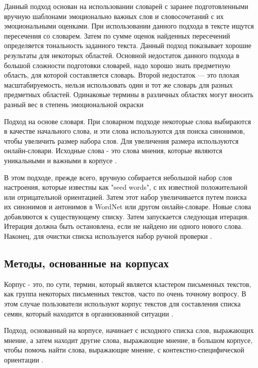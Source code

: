 Данный подход основан на использовании словарей с заранее подготовленными
вручную шаблонами эмоционально важных слов и словосочетаний с их эмоциональными
оценками. При использовании данного подхода в тексте ищутся пересечения со
словарем. Затем по сумме оценок найденных пересечений определяется тональность
заданного текста. Данный подход показывает хорошие результаты для некоторых
областей. Основной недостаток данного подхода в большой сложности подготовки
словарей, надо хорошо знать предметную область, для которой составляется
словарь. Второй недостаток — это плохая масштабируемость, нельзя использовать
один и тот же словарь для разных предметных областей. Одинаковые термины в
различных областях могут вносить разный вес в степень эмоциональной окраски
\cite{article9}

Подход на основе словаря. При словарном подходе некоторые слова выбираются в
качестве начального слова, и эти слова используются для поиска синонимов, чтобы
увеличить размер набора слов. Для увеличения размера используются
онлайн-словари. Исходные слова - это слова мнения, которые являются уникальными
и важными в корпусе \cite{article16}.

В этом подходе, прежде всего, вручную собирается небольшой набор слов
настроения, которые известны как "seed words", с их известной положительной или
отрицательной ориентацией. Затем этот набор увеличивается путем поиска их
синонимов и антонимов в WordNet или другом онлайн-словаре.  Новые слова
добавляются к существующему списку. Затем запускается следующая итерация.
Итерация должна быть остановлена, если не найдено ни одного нового слова.
Наконец, для очистки списка используется набор ручной проверки \cite{article4}.

\subsection{Методы, основанные на корпусах}

Корпус - это, по сути, термин, который является кластером письменных текстов,
как группа некоторых письменных текстов, часто по очень точному вопросу. В этом
случае пользователи используют корпус текстов для составления списка семян,
который находится в организованной ситуации \cite{article18}.

Подход, основанный на корпусе, начинает с исходного списка слов, выражающих
мнение, а затем находит другие слова, выражающие мнение, в большом корпусе,
чтобы помочь найти слова, выражающие мнение, с контекстно-специфической
ориентации \cite{article2}.

